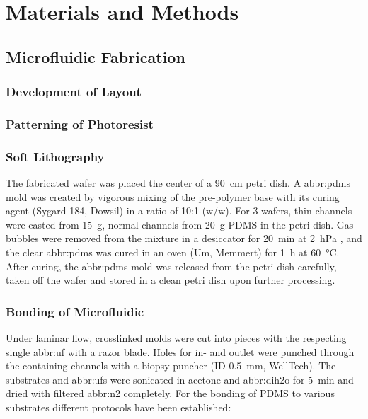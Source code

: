 \chapter{Materials and Methods}

\section{Microfluidic Fabrication}

\subsection{Development of Layout}

\subsection{Patterning of Photoresist}

\subsection{Soft Lithography}
The fabricated wafer was placed the center of a \SI{90}{\centi\meter} petri dish. A \gls{abbr:pdms} mold was created by vigorous mixing of the pre-polymer base with its curing agent (Sygard 184, Dowsil) in a ratio of 10:1 (w/w). For \SI{3}{\inch} wafers, thin channels were casted from \SI{15}{\gram}, normal channels from \SI{20}{\gram} PDMS in the petri dish. Gas bubbles were removed from the mixture in a desiccator for \SI{20}{\minute} at \SI{2}{\hecto\pascal} , and the clear \gls{abbr:pdms} was cured in an oven (Um, Memmert) for \SI{1}{\hour} at \SI{60}{\degreeCelsius}. After curing, the \gls{abbr:pdms} mold was released from the petri dish carefully, taken off the wafer and stored in a clean petri dish upon further processing.

\subsection{Bonding of Microfluidic}
Under laminar flow, crosslinked molds were cut into pieces with the respecting single \gls{abbr:uf} with a razor blade. Holes for in- and outlet were punched through the containing channels with a biopsy puncher (ID \SI{0.5}{\milli\meter}, WellTech). The substrates and \glspl{abbr:uf} were sonicated in acetone and \gls{abbr:dih2o} for \SI{5}{\minute} and dried with filtered \gls{abbr:n2} completely. For the bonding of PDMS to various substrates different protocols have been established:

